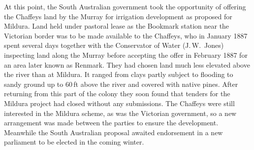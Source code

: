 At this point, the South Australian government took the opportunity of
offering the Chaffeys land by the Murray for irrigation development as
proposed for Mildura.  Land held under pastoral lease as the Bookmark
station near the Victorian border was to be made available to the
Chaffeys, who in January 1887 spent several days together with the
Conservator of Water (J.\,W.~Jones) inspecting land along the Murray
before accepting the offer in February 1887 for an area later known as
Renmark.  They had chosen land much less elevated above the
river than at Mildura.  It ranged from clays partly subject to
flooding to sandy ground up to 60\,ft above the river and covered with
native pines.  After returning from this part of the colony they soon
found that tenders for the Mildura project had closed without any
submissions.  The Chaffeys were still interested in the Mildura
scheme, as was the Victorian government, so a new arrangement was made
between the parties to ensure the development.  Meanwhile the South
Australian proposal awaited endorsement in a new parliament to be
elected in the coming winter.

